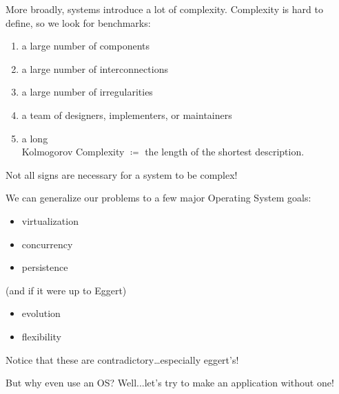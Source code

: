 \documentclass[../../lecture_notes.tex]{subfiles}
\begin{document}
More broadly, systems introduce a lot of complexity. Complexity is hard to define, so we look for benchmarks:
\begin{enumerate}[label=(\roman*)]
	\item a large number of components
	\item a large number of interconnections
	\item a large number of irregularities
	\item a team of designers, implementers, or maintainers
	\item a long \\
                        Kolmogorov Complexity $\coloneqq$ the length of the shortest description.
\end{enumerate}
Not all signs are necessary for a system to be complex!


We can generalize our problems to a few major Operating System goals:
\begin{itemize}
	\item virtualization
	\item concurrency
	\item persistence
\end{itemize}
    (and if it were up to Eggert)
\begin{itemize}
	\item evolution
	\item flexibility
\end{itemize}
Notice that these are contradictory…especially eggert’s!

But why even use an OS? Well...let's try to make an application without one!
\end{document}
